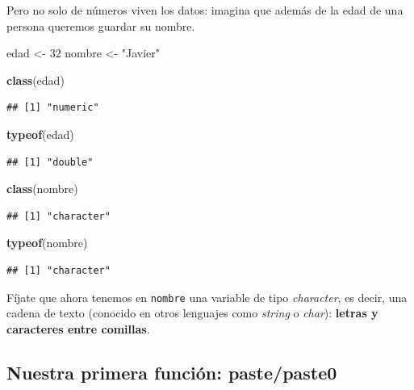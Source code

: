 \documentclass[11pt,]{book}
\newenvironment{Shaded}{\begin{snugshade}}{\end{snugshade}}
\newcommand{\DecValTok}[1]{\textcolor[rgb]{0.06,0.06,0.06}{#1}}
\newcommand{\KeywordTok}[1]{\textcolor[rgb]{0.27,0.27,0.27}{\textbf{#1}}}
\newcommand{\NormalTok}[1]{#1}
\newcommand{\StringTok}[1]{\textcolor[rgb]{0.5,0.5,0.5}{#1}}
\begin{document}
Pero no solo de números viven los datos: imagina que además de la edad de una persona queremos guardar su nombre.

\begin{Shaded}
\begin{Highlighting}[]
\NormalTok{edad <-}\StringTok{ }\DecValTok{32}
\NormalTok{nombre <-}\StringTok{ "Javier"}

\KeywordTok{class}\NormalTok{(edad)}
\end{Highlighting}
\end{Shaded}

\begin{verbatim}
## [1] "numeric"
\end{verbatim}

\begin{Shaded}
\begin{Highlighting}[]
\KeywordTok{typeof}\NormalTok{(edad)}
\end{Highlighting}
\end{Shaded}

\begin{verbatim}
## [1] "double"
\end{verbatim}

\begin{Shaded}
\begin{Highlighting}[]
\KeywordTok{class}\NormalTok{(nombre)}
\end{Highlighting}
\end{Shaded}

\begin{verbatim}
## [1] "character"
\end{verbatim}

\begin{Shaded}
\begin{Highlighting}[]
\KeywordTok{typeof}\NormalTok{(nombre)}
\end{Highlighting}
\end{Shaded}

\begin{verbatim}
## [1] "character"
\end{verbatim}

Fíjate que ahora tenemos en \texttt{nombre} una variable de tipo \emph{character}, es decir, una cadena de texto (conocido en otros lenguajes como \emph{string} o \emph{char}): \textbf{letras y caracteres entre comillas}.

\hypertarget{nuestra-primera-funciuxf3n-pastepaste0}{%
\subsection{Nuestra primera función: paste/paste0}\label{nuestra-primera-funciuxf3n-pastepaste0}}
\end{document}
